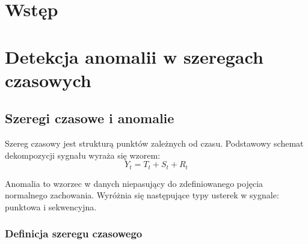 \documentclass[a4paper,twoside,12pt]{book}
\newcounter{stronyPozaNumeracja}
\begin{document}
	
	
	
	\tableofcontents
	
	\setcounter{stronyPozaNumeracja}{\value{page}}
	\mainmatter
	\pagestyle{empty}
	
	\cleardoublepage
	
	\pagestyle{NumeryStronNazwyRozdzialow}
	
	
	\chapter{Wstęp}
	
	
	
	
	\chapter{Detekcja anomalii w szeregach czasowych}
	
	\section{Szeregi czasowe i anomalie}
	Szereg czasowy jest strukturą punktów zależnych od czasu. Podstawowy schemat dekompozycji sygnału wyraża się wzorem:
	\begin{equation}
		Y_t = T_t + S_t + R_t
	\end{equation}
	
	Anomalia to wzorzec w danych niepasujący do zdefiniowanego pojęcia normalnego zachowania. Wyróżnia się następujące typy usterek w sygnale: punktowa i sekwencyjna.
	\subsection{Definicja szeregu czasowego}
\end{document}
